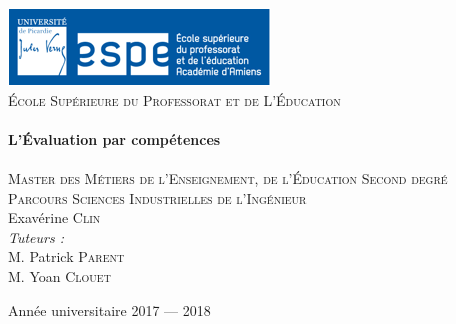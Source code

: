 \begin{titlepage}
  \begin{sffamily}
  \begin{center}

    \includegraphics[scale=0.8]{./images/logo_espe}~\\[1cm]
    \textsc{\LARGE École Supérieure du Professorat et de L'Éducation}\\[1.2cm]

    \HRule \\[0.4cm]
    { \huge \bfseries L'Évaluation par compétences\\[0.6cm] }
    \HRule \\[1.2cm]

    \textsc{\Large Master des Métiers de l'Enseignement, de l'Éducation Second degré}\\[0.5cm]
    \textsc{\Large Parcours Sciences Industrielles de l'Ingénieur}\\[0.8cm]

         {\large Exavérine \textsc{Clin}}\\[0.8cm]
        \emph{Tuteurs :} \\
        M. Patrick \textsc{Parent}\\
        M. Yoan \textsc{Clouet}\\[0.4cm]

    \vfill

    {Année universitaire 2017 — 2018}

  \end{center}
  \end{sffamily}
\end{titlepage}
